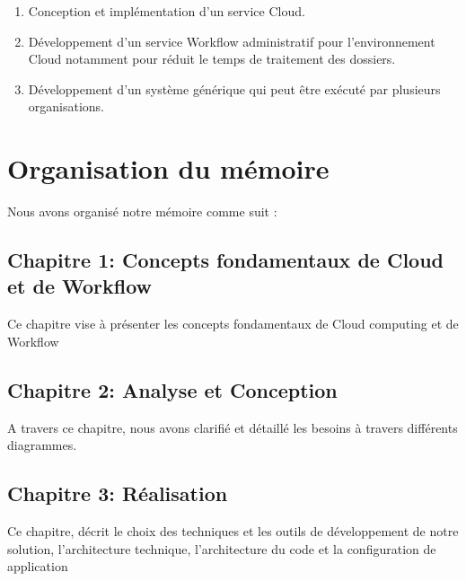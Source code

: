 \begin{enumerate}
\item Conception et implémentation d'un service Cloud.

\item Développement d'un service Workflow administratif  pour l'environnement Cloud notamment pour réduit le temps de traitement des dossiers.  

\item Développement d'un système générique qui peut être exécuté par plusieurs  organisations. 
\end{enumerate}



\section*{Organisation du mémoire}

Nous avons organisé notre mémoire comme suit : 
\subsection*{Chapitre 1: Concepts fondamentaux de Cloud et de Workflow} 

Ce chapitre vise à présenter les concepts fondamentaux de Cloud computing  et de Workflow 
\subsection*{Chapitre 2: Analyse et Conception} 
A travers ce chapitre, nous avons clarifié et détaillé les besoins à travers différents diagrammes. 
\subsection*{Chapitre 3: Réalisation}


Ce chapitre, décrit le choix des techniques et les outils de développement de notre solution, l’architecture technique, l’architecture du code et la configuration de application 
